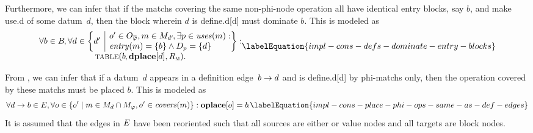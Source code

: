 Furthermore, we can infer that if the \glspl{match} covering the same
non-\gls{phi-node} \gls{operation} all have identical \glspl{entry block}, say
$b$\hspace{-1pt}, and make \gls{use.d} of some \gls{datum}~$d$\hspace{-1pt},
then the \gls{block} wherein $d$ is \gls{define.d}[d] must dominate
$b$\hspace{-1pt}.
%
This is modeled as
%
\begin{equation}
  \begin{array}{@{}c@{}}
    \forall b \in \mBlockSet \hspace{-1pt},
    \forall d \in
      \mSetBuilder*{d'}%
                   {%
                     \begin{array}{@{}l@{}}
                       o' \in \mOpCompSet{\mPhi},
                       m \in \mMatchSet[d'] \hspace{-1pt},
                       \exists p \in \mUses(m) : \\
                       \mEntry(m) = \mSet{b} \mAnd \mDataSet[p] = \mSet{d}
                     \end{array}
                   } : \\
    \mTable(b \hspace{-.8pt}, \mVar{dplace}[d], \mDomMatrix).
  \end{array}
  \labelEquation{impl-cons-defs-dominate-entry-blocks}
\end{equation}

From , we can infer that if a \gls{datum}~$d$ appears in
a \gls{definition edge}~$b \rightarrow d$ and is \gls{define.d}[d] by
\glspl{phi-match} only, then the \gls{operation} covered by these \glspl{match}
must be placed $b$.
%
This is modeled as
%
\begin{equation}
  \forall \mEdge{d}{b} \in \mFunctionDefEdgeSet,
  \forall o \in
    \mSetBuilder{o'}%
                {%
                  \begin{array}{@{}l@{}}
                    m \in \mMatchSet[d] \cap \mPhiMatchSet,
                    o' \in \mCovers(m)
                  \end{array}
                } :
  \mVar{oplace}[o] = b \hspace{-1pt}.
  \labelEquation{impl-cons-place-phi-ops-same-as-def-edges}
\end{equation}
%
It is assumed that the \glspl{edge} in $E$ have been
reoriented such that all \glspl{source} are either  or
\glspl{value node} and all \glspl{target} are \glspl{block node}.


